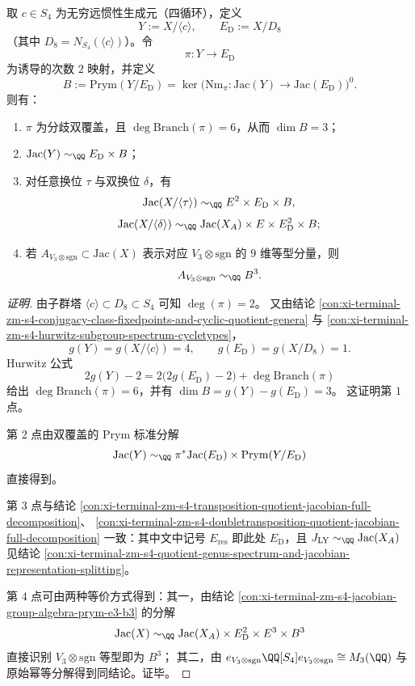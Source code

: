 \begin{conclusion}\label{con:xi-terminal-zm-s4-c4-prym-threefold-and-v3sgn-identification}
取 \(c\in S_4\) 为无穷远惯性生成元（四循环），定义
\[
Y:=X/\langle c\rangle,\qquad
E_{\mathrm D}:=X/D_8
\]
（其中 \(D_8=N_{S_4}(\langle c\rangle)\)）。令
\[
\pi:Y\longrightarrow E_{\mathrm D}
\]
为诱导的次数 \(2\) 映射，并定义
\[
B:=\mathrm{Prym}(Y/E_{\mathrm D})
=\ker\!\bigl(\mathrm{Nm}_\pi:\mathrm{Jac}(Y)\to \mathrm{Jac}(E_{\mathrm D})\bigr)^0.
\]
则有：
\begin{enumerate}
  \item \(\pi\) 为分歧双覆盖，且 \(\deg\mathrm{Branch}(\pi)=6\)，从而 \(\dim B=3\)；
  \item \(\mathrm{Jac}(Y)\sim_{\QQ}E_{\mathrm D}\times B\)；
  \item 对任意换位 \(\tau\) 与双换位 \(\delta\)，有
  \[
  \mathrm{Jac}(X/\langle\tau\rangle)\sim_{\QQ}E^2\times E_{\mathrm D}\times B,
  \]
  \[
  \mathrm{Jac}(X/\langle\delta\rangle)\sim_{\QQ}\mathrm{Jac}(X_A)\times E\times E_{\mathrm D}^2\times B;
  \]
  \item 若 \(A_{V_3\otimes\mathrm{sgn}}\subset \mathrm{Jac}(X)\) 表示对应 \(V_3\otimes\mathrm{sgn}\) 的 \(9\) 维等型分量，则
  \[
  A_{V_3\otimes\mathrm{sgn}}\sim_{\QQ}B^3.
  \]
\end{enumerate}
\end{conclusion}
\begin{proof}[证明]
由子群塔 \(\langle c\rangle\subset D_8\subset S_4\) 可知 \(\deg(\pi)=2\)。
又由结论 \ref{con:xi-terminal-zm-s4-conjugacy-class-fixedpoints-and-cyclic-quotient-genera} 与
\ref{con:xi-terminal-zm-s4-hurwitz-subgroup-spectrum-cycletypes}，
\[
g(Y)=g(X/\langle c\rangle)=4,\qquad g(E_{\mathrm D})=g(X/D_8)=1.
\]
Hurwitz 公式
\[
2g(Y)-2=2\bigl(2g(E_{\mathrm D})-2\bigr)+\deg\mathrm{Branch}(\pi)
\]
给出 \(\deg\mathrm{Branch}(\pi)=6\)，并有
\(
\dim B=g(Y)-g(E_{\mathrm D})=3
\)。
这证明第 \(1\) 点。

第 \(2\) 点由双覆盖的 Prym 标准分解
\[
\mathrm{Jac}(Y)\sim_{\QQ}\pi^*\mathrm{Jac}(E_{\mathrm D})\times \mathrm{Prym}(Y/E_{\mathrm D})
\]
直接得到。

第 \(3\) 点与结论
\ref{con:xi-terminal-zm-s4-transposition-quotient-jacobian-full-decomposition}、
\ref{con:xi-terminal-zm-s4-doubletransposition-quotient-jacobian-full-decomposition}
一致：其中文中记号 \(E_{\mathrm{res}}\) 即此处 \(E_{\mathrm D}\)，且
\(
J_{\mathrm{LY}}\sim_{\QQ}\mathrm{Jac}(X_A)
\)
见结论
\ref{con:xi-terminal-zm-s4-quotient-genus-spectrum-and-jacobian-representation-splitting}。

第 \(4\) 点可由两种等价方式得到：其一，由结论
\ref{con:xi-terminal-zm-s4-jacobian-group-algebra-prym-e3-b3}
的分解
\[
\mathrm{Jac}(X)\sim_{\QQ}\mathrm{Jac}(X_A)\times E_{\mathrm D}^2\times E^3\times B^3
\]
直接识别 \(V_3\otimes\mathrm{sgn}\) 等型即为 \(B^3\)；
其二，由
\(
e_{V_3\otimes\mathrm{sgn}}\QQ[S_4]e_{V_3\otimes\mathrm{sgn}}\cong M_3(\QQ)
\)
与原始幂等分解得到同结论。证毕。
\end{proof}


